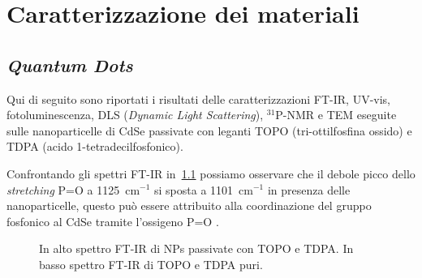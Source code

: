 \chapter{Caratterizzazione dei materiali}
\label{chap:risultati}

\section[Quantum Dots]{\emph{Quantum Dots}}
 Qui di seguito sono riportati i risultati delle caratterizzazioni FT-IR, UV-vis, fotoluminescenza, DLS (\emph{Dynamic Light Scattering}), 
 $^{31}$P-NMR e TEM eseguite sulle nanoparticelle di CdSe passivate con leganti TOPO (tri-ottilfosfina ossido) e TDPA (acido 1-tetradecilfosfonico).

{
Confrontando gli spettri FT-IR in~\ref{fig:CdSe-TOPO_TDPA-IR-TOPO_TDPA} possiamo osservare che il debole picco dello \emph{stretching} P=O a 1125~cm$^{-1}$ si sposta a 1101~cm$^{-1}$ in presenza delle nanoparticelle, questo può essere attribuito alla coordinazione del gruppo fosfonico al CdSe tramite l'ossigeno P=O  \cite{lig-CdSe-caratt}}. 

\begin{figure}
\caption{\footnotesize{In alto spettro FT-IR di NPs passivate con TOPO e TDPA\@. In basso spettro FT-IR di TOPO e TDPA puri.}
\label{fig:CdSe-TOPO_TDPA-IR-TOPO_TDPA}}
\end{figure}

